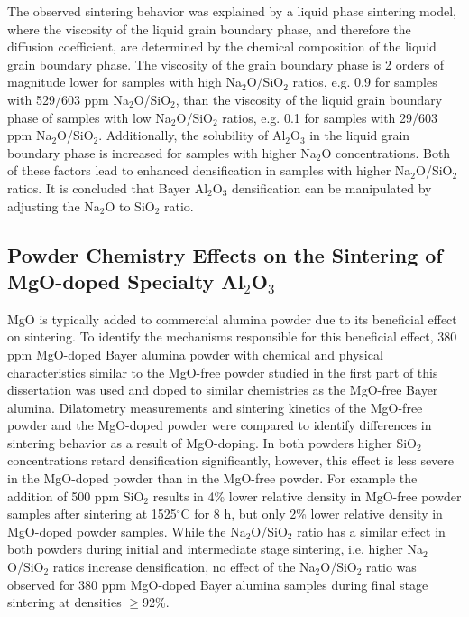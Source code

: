 The observed sintering behavior was explained by a liquid phase sintering model, where the viscosity of the liquid grain boundary phase, and therefore the diffusion coefficient, are determined by the chemical composition of the liquid grain boundary phase. The viscosity of the grain boundary phase is 2 orders of magnitude lower for samples with high Na$_{2}$O/SiO$_{2}$ ratios, e.g. 0.9 for samples with 529/603 ppm Na$_{2}$O/SiO$_{2}$, than the viscosity of the liquid grain boundary phase of samples with low Na$_{2}$O/SiO$_{2}$ ratios, e.g. 0.1 for samples with 29/603 ppm Na$_{2}$O/SiO$_{2}$. Additionally, the solubility of Al$_{2}$O$_{3}$ in the liquid grain boundary phase is increased for samples with higher Na$_{2}$O concentrations. Both of these factors lead to enhanced densification in samples with higher Na$_{2}$O/SiO$_{2}$ ratios. It is concluded that Bayer Al$_{2}$O$_{3}$ densification can be manipulated by adjusting the Na$_{2}$O to SiO$_{2}$ ratio.

\subsection{Powder Chemistry Effects on the Sintering of MgO-doped Specialty Al$_{2}$O$_{3}$}
MgO is typically added to commercial alumina powder due to its beneficial effect on sintering. To identify the mechanisms responsible for this beneficial effect, 380 ppm MgO-doped Bayer alumina powder with chemical and physical characteristics similar to the MgO-free powder studied in the first part of this dissertation was used and doped to similar chemistries as the MgO-free Bayer alumina. Dilatometry measurements and sintering kinetics of the MgO-free powder and the MgO-doped powder were compared to identify differences in sintering behavior as a result of MgO-doping. In both powders higher SiO$_{2}$ concentrations retard densification significantly, however, this effect is less severe in the MgO-doped powder than in the MgO-free powder. For example the addition of 500 ppm SiO$_{2}$ results in 4\% lower relative density in MgO-free powder samples after sintering at 1525$^{\circ}$C for 8 h, but only 2\% lower relative density in MgO-doped powder samples. While the Na$_{2}$O/SiO$_{2}$ ratio has a similar effect in both powders during initial and intermediate stage sintering, i.e. higher Na$_{2}$O/SiO$_{2}$ ratios increase densification, no effect of the Na$_{2}$O/SiO$_{2}$ ratio was observed for 380 ppm MgO-doped Bayer alumina samples during final stage sintering at densities $\geq$92\%. 

